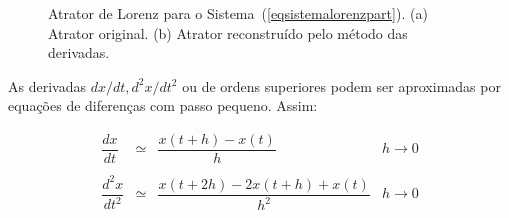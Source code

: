 \begin{figure}[ht]
\centering 
{}
\caption{Atrator de Lorenz para o Sistema~(\ref{eqsistemalorenzpart}). (a) Atrator original. (b) Atrator reconstruído pelo método das derivadas.}
\label{lorenzdiff}
\end{figure}

As derivadas $dx/dt,d^{2}x/dt^{2}$ ou de ordens superiores podem ser aproximadas por equações de diferenças com passo pequeno. Assim:

\begin{equation}
\begin{array}{rcll} \dfrac{dx}{dt} & \simeq & \dfrac{x(t+h)-x(t)}{h} & h\rightarrow 0 \\ 
                     & & &  \\
                    \dfrac{d^{2}x}{dt^{2}} & \simeq & \dfrac{x(t+2h)-2x(t+h)+x(t)}{h^2} & h\rightarrow 0 
\end{array}
\label{eqderivadapack}
\end{equation}

